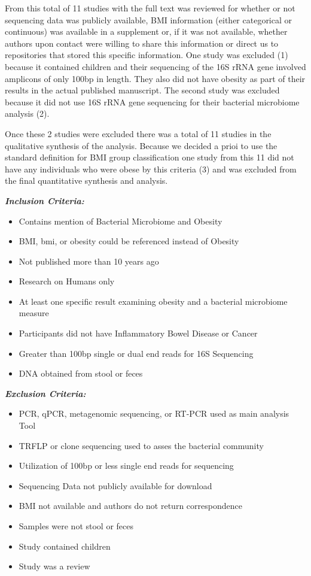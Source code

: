 \documentclass[12pt,]{article}
\providecommand{\tightlist}{%
  \setlength{\itemsep}{0pt}\setlength{\parskip}{0pt}}
\begin{document}
From this total of 11 studies with the full text was reviewed for
whether or not sequencing data was publicly available, BMI information
(either categorical or continuous) was available in a supplement or, if
it was not available, whether authors upon contact were willing to share
this information or direct us to repositories that stored this specific
information. One study was excluded (1) because it contained children
and their sequencing of the 16S rRNA gene involved amplicons of only
100bp in length. They also did not have obesity as part of their results
in the actual published manuscript. The second study was excluded
because it did not use 16S rRNA gene sequencing for their bacterial
microbiome analysis (2).

Once these 2 studies were excluded there was a total of 11 studies in
the qualitative synthesis of the analysis. Because we decided a prioi to
use the standard definition for BMI group classification one study from
this 11 did not have any individuals who were obese by this criteria (3)
and was excluded from the final quantitative synthesis and analysis.

\textbf{\emph{Inclusion Criteria:}}

\begin{itemize}
\tightlist
\item
  Contains mention of Bacterial Microbiome and Obesity
\item
  BMI, bmi, or obesity could be referenced instead of Obesity
\item
  Not published more than 10 years ago
\item
  Research on Humans only
\item
  At least one specific result examining obesity and a bacterial
  microbiome measure
\item
  Participants did not have Inflammatory Bowel Disease or Cancer
\item
  Greater than 100bp single or dual end reads for 16S Sequencing
\item
  DNA obtained from stool or feces
\end{itemize}

\textbf{\emph{Exclusion Criteria:}}

\begin{itemize}
\tightlist
\item
  PCR, qPCR, metagenomic sequencing, or RT-PCR used as main analysis
  Tool
\item
  TRFLP or clone sequencing used to asses the bacterial community
\item
  Utilization of 100bp or less single end reads for sequencing
\item
  Sequencing Data not publicly available for download
\item
  BMI not available and authors do not return correspondence
\item
  Samples were not stool or feces
\item
  Study contained children
\item
  Study was a review
\end{itemize}
\end{document}
